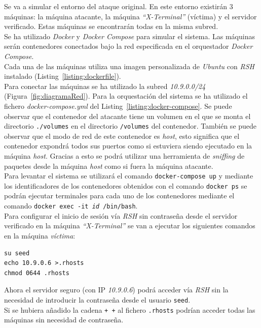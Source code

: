 \documentclass{article}
\begin{document}
Se va a simular el entorno del ataque original. En este entorno existirán 3 máquinas: la máquina atacante, la máquina \textit{``X-Terminal''} (víctima) y el servidor verificado. Estas máquinas se encontrarán todas en la misma subred.\\
Se ha utilizado \textit{Docker} y \textit{Docker Compose} para simular el sistema. Las máquinas serán contenedores conectados bajo la red especificada en el orquestador \textit{Docker Compose}.\\
Cada una de las máquinas utiliza una imagen personalizada de \textit{Ubuntu} con \textit{RSH} instalado (Listing~\ref{listing:dockerfile}).\\
Para conectar las máquinas se ha utilizado la subred \textit{10.9.0.0/24} (Figura~\ref{fig:diagramaRed}). Para la orquestación del sistema se ha utilizado el fichero \textit{docker-compose.yml} del Listing~\ref{listing:docker-compose}. Se puede observar que el contenedor del atacante tiene un volumen en el que se monta el directorio \texttt{./volumes} en el directorio \texttt{/volumes} del contenedor. También se puede observar que el modo de red de este contenedor es \textit{host}, esto significa que el contenedor expondrá todos sus puertos como si estuviera siendo ejecutado en la máquina \textit{host}. Gracias a esto se podrá utilizar una herramienta de \textit{sniffing} de paquetes desde la máquina \textit{host} como si fuera la máquina atacante.\\

Para levantar el sistema se utilizará el comando \texttt{docker-compose up} y mediante los identificadores de los contenedores obtenidos con el comando \texttt{docker ps} se podrán ejecutar terminales para cada uno de los contenedores mediante el comando \texttt{docker exec -it \textit{id} /bin/bash}.\\

Para configurar el inicio de sesión vía \textit{RSH} sin contraseña desde el servidor verificado en la máquina \textit{``X-Terminal''} se van a ejecutar los siguientes comandos en la máquina \textit{víctima}:

\begin{lstlisting}
su seed
echo 10.9.0.6 >.rhosts
chmod 0644 .rhosts
\end{lstlisting}

Ahora el servidor seguro (con IP \textit{10.9.0.6}) podrá acceder vía \textit{RSH} sin la necesidad de introducir la contraseña desde el usuario \texttt{seed}.\\
Si se hubiera añadido la cadena \texttt{+ +} al fichero \texttt{.rhosts} podrían acceder todas las máquinas sin necesidad de contraseña.\\
\end{document}
